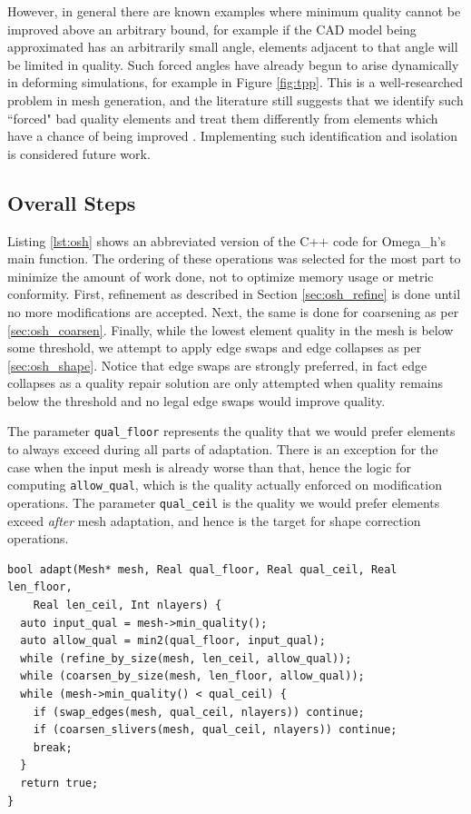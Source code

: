 However, in general there are known examples where minimum quality cannot be improved
above an arbitrary bound, for example if the CAD model being approximated has
an arbitrarily small angle, elements adjacent to that angle will be limited
in quality.
Such forced angles have already begun to arise dynamically in
deforming simulations, for example in Figure \ref{fig:tpp}.
This is a well-researched problem in mesh generation, and the literature
still suggests that we identify such ``forced" bad quality elements and treat them
differently from elements which have a chance of being improved \cite{engwirda2016conforming}.
Implementing such identification and isolation is considered future work.

\subsection{Overall Steps}
\label{sec:osh}

Listing \ref{lst:osh} shows an abbreviated version of the C++ code for
Omega\_h's main function.
The ordering of these operations was selected for the most part to minimize
the amount of work done, not to optimize memory usage or metric conformity.
First, refinement as described in Section \ref{sec:osh_refine} is done
until no more modifications are accepted.
Next, the same is done for coarsening as per \ref{sec:osh_coarsen}.
Finally, while the lowest element quality in the mesh is below some
threshold, we attempt to apply edge swaps and edge collapses as
per \ref{sec:osh_shape}.
Notice that edge swaps are strongly preferred, in fact edge
collapses as a quality repair solution are only attempted when
quality remains below the threshold and no legal edge swaps
would improve quality.

The parameter \texttt{qual\_floor} represents the quality that
we would prefer elements to always exceed during all parts of
adaptation.
There is an exception for the case when the input mesh is
already worse than that, hence the logic for computing
\texttt{allow\_qual}, which is the quality actually enforced
on modification operations.
The parameter \texttt{qual\_ceil} is the quality we would prefer
elements exceed \emph{after} mesh adaptation, and hence is the
target for shape correction operations.

\begin{lstlisting}[float,style=dan-style,caption=Omega\_h main function,label=lst:osh]
bool adapt(Mesh* mesh, Real qual_floor, Real qual_ceil, Real len_floor,
    Real len_ceil, Int nlayers) {
  auto input_qual = mesh->min_quality();
  auto allow_qual = min2(qual_floor, input_qual);
  while (refine_by_size(mesh, len_ceil, allow_qual));
  while (coarsen_by_size(mesh, len_floor, allow_qual));
  while (mesh->min_quality() < qual_ceil) {
    if (swap_edges(mesh, qual_ceil, nlayers)) continue;
    if (coarsen_slivers(mesh, qual_ceil, nlayers)) continue;
    break;
  }
  return true;
}
\end{lstlisting}

